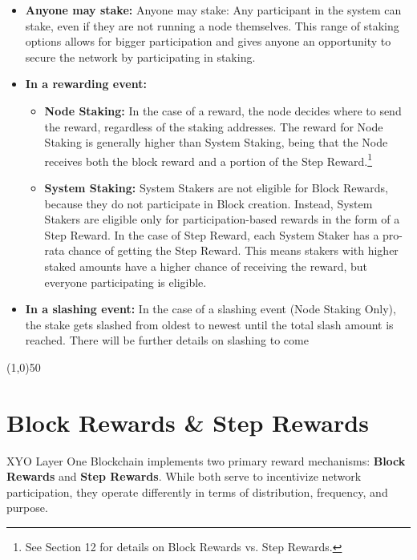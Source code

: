 \documentclass{article}
\begin{document}
\begin{itemize}
    \item \textbf{Anyone may stake:} Anyone may stake: Any participant in the system can stake, even if they are not running a node themselves. This range of staking options allows for bigger participation and gives anyone an opportunity to secure the network by participating in staking. 
    \item \textbf{In a rewarding event:} \begin{itemize}
        \item \textbf{Node Staking:} In the case of a reward, the node decides where to send the reward, regardless of the staking addresses. The reward for Node Staking is generally higher than System Staking, being that the Node receives both the block reward and a portion of the Step Reward.\footnote{ See Section 12 for details on Block Rewards vs. Step Rewards.}
        \item \textbf{System Staking:} System Stakers are not eligible for Block Rewards, because they do not participate in Block creation. Instead, System Stakers are eligible only for participation-based rewards in the form of a Step Reward. In the case of Step Reward, each System Staker has a pro-rata chance of getting the Step Reward. This means stakers with higher staked amounts have a higher chance of receiving the reward, but everyone participating is eligible.

    \end{itemize}
    \item \textbf{In a slashing event:} In the case of a slashing event (Node Staking Only), the stake gets slashed from oldest to newest until the total slash amount is reached. There will be further details on slashing to come
 \end{itemize}

\begin{center}
\line(1,0){50}
\end{center}

\section{Block Rewards \& Step Rewards}

XYO Layer One Blockchain implements two primary reward mechanisms:
\textbf{Block Rewards} and \textbf{Step Rewards}. While both serve to
incentivize network participation, they operate differently in terms of
distribution, frequency, and purpose.
\end{document}
